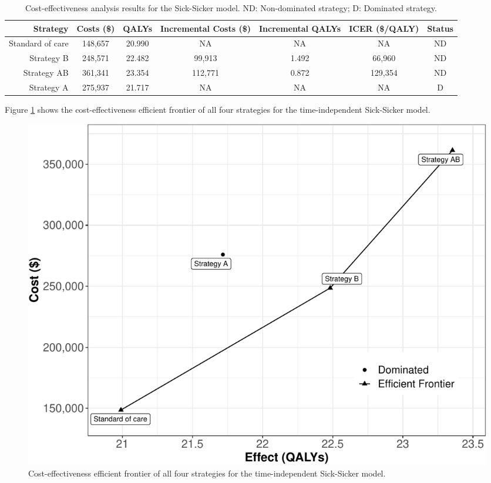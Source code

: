 \documentclass[
]{article}
\begin{document}
\begin{table}[!h]

\caption{\label{tab:table-cea}Cost-effectiveness analysis results for the Sick-Sicker model. ND: Non-dominated strategy; D: Dominated strategy.}
\centering
\begin{tabular}[t]{rcccccc}
\toprule
Strategy & Costs (\$) & QALYs & Incremental Costs (\$) & Incremental QALYs & ICER (\$/QALY) & Status\\
\midrule
Standard of care & 148,657 & 20.990 & NA & NA & NA & ND\\
Strategy B & 248,571 & 22.482 & 99,913 & 1.492 & 66,960 & ND\\
Strategy AB & 361,341 & 23.354 & 112,771 & 0.872 & 129,354 & ND\\
Strategy A & 275,937 & 21.717 & NA & NA & NA & D\\
\bottomrule
\end{tabular}
\end{table}

Figure \ref{fig:Sick-Sicker-CEA} shows the cost-effectiveness efficient frontier of all four strategies for the time-independent Sick-Sicker model.

\begin{figure}[H]

{\centering \includegraphics{figs/Sick-Sicker-CEA-1} 

}

\caption{Cost-effectiveness efficient frontier of all four strategies for the time-independent Sick-Sicker model.}\label{fig:Sick-Sicker-CEA}
\end{figure}
\end{document}
